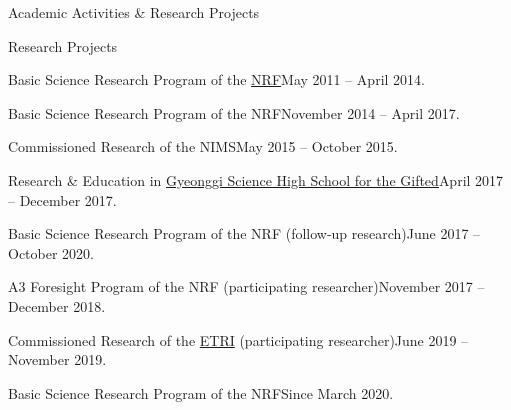 \documentclass{resume} %
\newcommand{\fakesection}[1]{%
  \par\refstepcounter{section}%
  \sectionmark{#1}%
  \addcontentsline{toc}{section}{\protect\numberline{\thesection}#1}%
}
\begin{document}
\begin{rSection}{Academic Activities \& Research Projects}
\begin{rSubsection}{Research Projects}{}{}{}
\item Basic Science Research Program of the \href{https://www.nrf.re.kr/index}{NRF}\hfill May 2011 -- April 2014.
\item Basic Science Research Program of the NRF\hfill November 2014 -- April 2017.
\item Commissioned Research of the NIMS\hfill May 2015 -- October 2015.
\item Research \& Education in \href{https://www.gs.hs.kr/entrance/index.do}{Gyeonggi Science High School for the Gifted}\hfill April 2017 -- December 2017.
\item Basic Science Research Program of the NRF (follow-up research)\hfill June 2017 -- October 2020.
\item A3 Foresight Program of the NRF (participating researcher)\hfill November 2017 -- December 2018.
\item Commissioned Research of the \href{https://www.etri.re.kr/intro.html}{ETRI} (participating researcher)\hfill June 2019 -- November 2019.
\item Basic Science Research Program of the NRF\hfill Since March 2020.%
\end{rSubsection}
\end{rSection}

%
\end{document}
